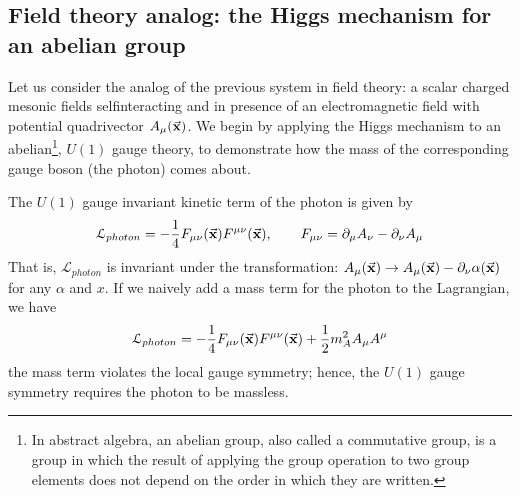\documentclass[../main/main.tex]{subfiles}
\begin{document}
\subsection{Field theory analog: the Higgs mechanism for an abelian group}
Let us consider the analog of the previous system in field theory: a scalar charged mesonic fields selfinteracting and in presence of an electromagnetic field with potential quadrivector \( A_ \mu  ( \va{x}) \). We begin by applying the Higgs mechanism to an abelian\footnote{In abstract algebra, an abelian group, also called a commutative group, is a group in which the result of applying the group operation to two group elements does not depend on the order in which they are written.}, \( U(1) \)  gauge theory, to demonstrate how the mass of the corresponding gauge boson (the photon) comes about.

The \( U(1) \) gauge invariant kinetic term of the photon is given by
\begin{equation*}
  \mathcal{L}_{photon} = - \frac{1}{4} F_ {\mu  \nu } (\va{x}) F ^{ \mu \nu } (\va{x}), \qquad F_ { \mu \nu } = \partial_ \mu  A _ \nu  - \partial _ \nu  A _ \mu
\end{equation*}
That is, \( \mathcal{L}_{photon}  \)  is invariant under the transformation: \( A_\mu (\va{x}) \rightarrow A_\mu (\va{x}) - \partial_ \nu \alpha  (\va{x})  \) for any \( \alpha  \) and \( x \).
If we naively add a mass term for the photon to the Lagrangian, we have
\begin{equation*}
    \mathcal{L}_{photon} = - \frac{1}{4} F_ {\mu  \nu } (\va{x}) F ^{ \mu \nu } (\va{x}) + \frac{1}{2} m_A^2 A_\mu A^\mu
\end{equation*}
 the mass term violates the local gauge symmetry; hence, the \( U(1) \)  gauge symmetry requires the photon to be massless.
\end{document}
